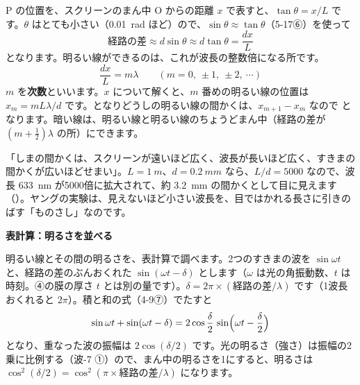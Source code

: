 P の位置を、スクリーンのまん中 O からの距離 $x$ で表すと、$\tan\theta=x/L$ です。$\theta$ はとても小さい（\qty{0.01}{rad} ほど）ので、$\sin\theta\approx\tan\theta$（5-17⑥）を使って
\[ \text{経路の差}\approx d\sin\theta\approx d\tan\theta=\frac{dx}{L} \]
となります。明るい線ができるのは、これが波長の整数倍になる所です。
\[ \frac{dx}{L}=m\lambda\qquad(m=0,\ \pm1,\ \pm2,\ \cdots) \]
$m$ を\textbf{次数}といいます。$x$ について解くと、$m$ 番めの明るい線の位置は $x_m=mL\lambda/d$ です。となりどうしの明るい線の間かくは、$x_{m+1}-x_m$ なので\label{ph:波-13:young}%
となります。暗い線は、明るい線と明るい線のちょうどまん中（経路の差が $(m+\tfrac12)\lambda$ の所）にできます。

\begin{phyomi}[$\Delta x=L\lambda/d$]
「しまの間かくは、スクリーンが遠いほど広く、波長が長いほど広く、すきまの間かくが広いほどせまい」。$L=\qty{1}{m}$、$d=\qty{0.2}{mm}$ なら、$L/d=5000$ なので、波長 \qty{633}{nm} が5000倍に拡大されて、約 \qty{3.2}{mm} の間かくとして目に見えます（\nobreak{}\nobreak）。ヤングの実験は、見えないほど小さい波長を、目ではかれる長さに引きのばす「ものさし」なのです。
\end{phyomi}

\begin{phflow}[ヤングの実験]
\end{phflow}

\begin{phmodel}[ヤングの実験]
\end{phmodel}

\noindent\textbf{表計算：明るさを並べる}\par\nobreak
明るい線とその間の明るさを、表計算で調べます。2つのすきまの波を $\sin\omega t$ と、経路の差のぶんおくれた $\sin(\omega t-\delta)$ とします（$\omega$ は光の角振動数、$t$ は時刻。④の膜の厚さ $t$ とは別の量です）。$\delta=2\pi\times(\text{経路の差}/\lambda)$ です（1波長おくれると $2\pi$）。積と和の式（4-9⑦）でたすと
\[ \sin\omega t+\sin(\omega t-\delta)=2\cos\frac{\delta}{2}\,\sin\Bigl(\omega t-\frac{\delta}{2}\Bigr) \]
となり、重なった波の振幅は $2\cos(\delta/2)$ です。光の明るさ（強さ）は振幅の2乗に比例する（波-7 ①）ので、まん中の明るさを1にすると、明るさは $\cos^2(\delta/2)=\cos^2(\pi\times\text{経路の差}/\lambda)$ になります。

